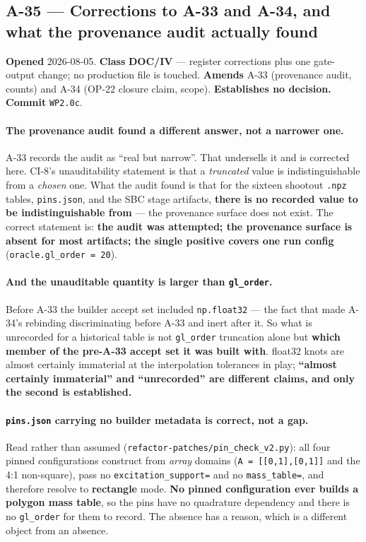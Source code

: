 \documentclass[
  10pt,
]{article}
\begin{document}
\hypertarget{a-35}{%
\subsection{A-35 --- Corrections to A-33 and A-34, and what the provenance audit actually found}\label{a-35}}

\textbf{Opened} 2026-08-05. \textbf{Class} \textbf{DOC/IV} --- register corrections plus one gate-output change; no production file is touched. \textbf{Amends} A-33 (provenance audit, counts) and A-34 (OP-22 closure claim, scope). \textbf{Establishes no decision.} \textbf{Commit} \texttt{WP2.0c}.

\paragraph{The provenance audit found a different answer, not a narrower one.}
A-33 records the audit as ``real but narrow''. That undersells it and is corrected here. CI-8's unauditability statement is that a \emph{truncated} value is indistinguishable from a \emph{chosen} one. What the audit found is that for the sixteen shootout \texttt{.npz} tables, \texttt{pins.json}, and the SBC stage artifacts, \textbf{there is no recorded value to be indistinguishable from} --- the provenance surface does not exist. The correct statement is: \textbf{the audit was attempted; the provenance surface is absent for most artifacts; the single positive covers one run config} (\texttt{oracle.gl\_order = 20}).

\paragraph{And the unauditable quantity is larger than \texttt{gl\_order}.}
Before A-33 the builder accept set included \texttt{np.float32} --- the fact that made A-34's rebinding discriminating before A-33 and inert after it. So what is unrecorded for a historical table is not \texttt{gl\_order} truncation alone but \textbf{which member of the pre-A-33 accept set it was built with}. float32 knots are almost certainly immaterial at the interpolation tolerances in play; \textbf{``almost certainly immaterial'' and ``unrecorded'' are different claims, and only the second is established.}

\paragraph{\texttt{pins.json} carrying no builder metadata is correct, not a gap.}
Read rather than assumed (\texttt{refactor-patches/\allowbreak{}pin\_check\_v2.py}): all four pinned configurations construct from \emph{array} domains (\texttt{A = [[0,1],[0,1]]} and the 4:1 non-square), pass no \texttt{excitation\_support=} and no \texttt{mass\_table=}, and therefore resolve to \textbf{rectangle} mode. \textbf{No pinned configuration ever builds a polygon mass table}, so the pins have no quadrature dependency and there is no \texttt{gl\_order} for them to record. The absence has a reason, which is a different object from an absence.
\end{document}

